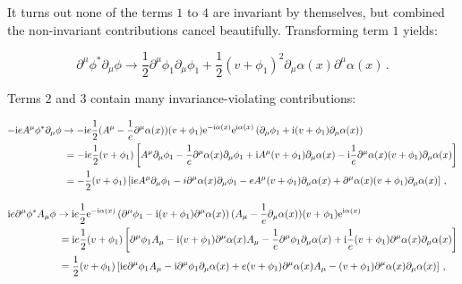 % 
It turns out none of the terms $1$ to $4$ are invariant by themselves, but combined the non-invariant contributions cancel beautifully.
% 
Transforming term $1$ yields:
% 
\begin{linenomath*}
\begin{equation}
\partial^\mu \phi^\ast \partial_\mu \phi \to
    \frac{1}{2} \partial^\mu \phi_1 \partial_\mu \phi_1
    + \frac{1}{2} (v+\phi_1)^2 \partial_\mu \alpha(x) \partial^\mu \alpha(x)
\,.
\end{equation}
\end{linenomath*}
% 
Terms $2$ and $3$ contain many invariance-violating contributions:
% 
\begin{linenomath*}
\begin{equation}
\begin{split}
-\imag e A^\mu \phi^\ast \partial_\mu \phi
% 
& \to -\imag e \frac{1}{2}
    (A^\mu - \frac{1}{e} \partial^\mu \alpha(x) )
    (v+\phi_1) \exp{-\imag \alpha(x)}
    \exp{\imag \alpha(x)} \left(
        \partial_\mu \phi_1 + \imag (v+\phi_1) \partial_\mu \alpha(x)
        \right)
    \\
% 
& \;= -\imag e \frac{1}{2} (v+\phi_1) \left[
    A^\mu \partial_\mu \phi_1
    - \frac{1}{e} \partial^\mu \alpha(x) \partial_\mu \phi_1
    + \imag A^\mu (v+\phi_1) \partial_\mu \alpha(x)
    - \imag \frac{1}{e} \partial^\mu \alpha(x) (v+\phi_1) \partial_\mu \alpha(x)
    \right]
    \\
% 
& \;= -\frac{1}{2} (v+\phi_1) \left[
    \imag e A^\mu \partial_\mu \phi_1
    - i \partial^\mu \alpha(x) \partial_\mu \phi_1
    - e A^\mu (v+\phi_1) \partial_\mu \alpha(x)
    + \partial^\mu \alpha(x) (v+\phi_1) \partial_\mu \alpha(x)
    \right]
% 
\,,
\end{split}
\end{equation}
\end{linenomath*}
% 
\begin{linenomath*}
\begin{equation}
\begin{split}
\imag e \partial^\mu \phi^\ast A_\mu \phi
% 
& \to \imag e \frac{1}{2}
    \exp{-\imag \alpha(x)} \left(
        \partial^\mu \phi_1 - \imag (v+\phi_1) \partial^\mu \alpha(x)
        \right)
    (A_\mu - \frac{1}{e} \partial_\mu \alpha(x) )
    (v+\phi_1) \exp{\imag \alpha(x)}
    \\
% 
& \;= \imag e \frac{1}{2} (v+\phi_1) \left[
    \partial^\mu \phi_1 A_\mu 
    - \imag (v+\phi_1) \partial^\mu \alpha(x) A_\mu
    - \frac{1}{e} \partial^\mu \phi_1 \partial_\mu \alpha(x)
    + \imag \frac{1}{e} (v+\phi_1) \partial^\mu \alpha(x) \partial_\mu \alpha(x)
    \right]
    \\
% 
& \;= \frac{1}{2} (v+\phi_1) \left[
    \imag e \partial^\mu \phi_1 A_\mu 
    - \imag \partial^\mu \phi_1 \partial_\mu \alpha(x)
    + e (v+\phi_1) \partial^\mu \alpha(x) A_\mu
    - (v+\phi_1) \partial^\mu \alpha(x) \partial_\mu \alpha(x)
    \right]
% 
\,,
\end{split}
\end{equation}
\end{linenomath*}
